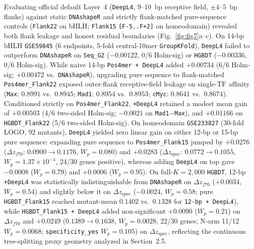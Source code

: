\documentclass[11pt,a4paper]{article}
\begin{document}
Evaluating official default Layer~4 (\texttt{DeepL4}, 9--10~bp receptive field, $\pm 4\text{--}5$~bp flanks) against static \texttt{DNAshapeR} and strictly flank-matched pure-sequence controls (\texttt{Flank22} on bHLH; \texttt{Flank15} \texttt{[F-5..F+2]} on homeodomain) revealed both flank leakage and honest residual boundaries (Fig.~\ref{fig:fig7}a--c). On 14-bp bHLH \texttt{GSE59845} (6 endpoints, 5-fold central-10mer \texttt{GroupKFold}), \texttt{DeepL4} failed to outperform \texttt{DNAshapeR} on \texttt{Seq\_G2} ($-0.00122$, 0/6 Holm-sig) or \texttt{HGBDT} ($-0.00336$, 0/6 Holm-sig). While naive 14-bp \texttt{Pos4mer + DeepL4} added $+0.00734$ (6/6 Holm-sig; $+0.00472$ vs.\ \texttt{DNAshapeR}), upgrading pure sequence to flank-matched \texttt{Pos4mer\_Flank22} exposed outer-flank receptive-field leakage on single-TF affinity (\texttt{Max}: $0.8991$ vs.\ $0.8945$; \texttt{Mad1}: $0.8954$ vs.\ $0.8953$; \texttt{cMyc}: $0.8641$ vs.\ $0.8674$). Conditioned strictly on \texttt{Pos4mer\_Flank22}, \texttt{+DeepL4} retained a modest mean gain of $+0.00503$ (4/6 two-sided Holm-sig; $-0.0021$ on \texttt{Mad1$-$Max}), and $+0.01166$ on \texttt{HGBDT\_Flank22} (5/6 two-sided Holm-sig). On homeodomain \texttt{GSE233827} (30-fold LOGO, 92 mutants), \texttt{DeepL4} yielded zero linear gain on either 12-bp or 15-bp pure sequence: expanding pure sequence to \texttt{Pos4mer\_Flank15} jumped by $+0.0276$ ($\Delta z_{f70}$: $0.0900 \to 0.1176$, $W_p = 0.080$) and $+0.0283$ ($\Delta z_{\mathrm{spec}}$: $0.0772 \to 0.1055$, $W_p = 1.37\times 10^{-4}$, 24/30 genes positive), whereas adding \texttt{DeepL4} on top gave $-0.0008$ ($W_p = 0.79$) and $+0.0006$ ($W_p = 0.95$). On full-$K=2{,}000$ \texttt{HGBDT}, 12-bp \texttt{+DeepL4} was statistically indistinguishable from \texttt{DNAshapeR} on $\Delta z_{f70}$ ($+0.0034$, $W_p = 0.54$) and slightly below it on $\Delta z_{\mathrm{spec}}$ ($-0.0024$, $W_p = 0.58$; pure \texttt{HGBDT\_Flank15} reached mutant-mean $0.1402$ vs.\ $0.1328$ for \texttt{12-bp + DeepL4}), while \texttt{HGBDT\_Flank15 + DeepL4} added non-significant $+0.0090$ ($W_p = 0.21$) on $\Delta z_{f70}$ and $+0.0249$ ($0.1389 \to 0.1638$, $W_p = 0.0028$, 22/30 genes; N-arm 11/12 $W_p = 0.0068$; \texttt{specificity\_yes} $W_p = 0.105$) on $\Delta z_{\mathrm{spec}}$, reflecting the continuous tree-splitting proxy geometry analyzed in Section~2.5.
\end{document}
